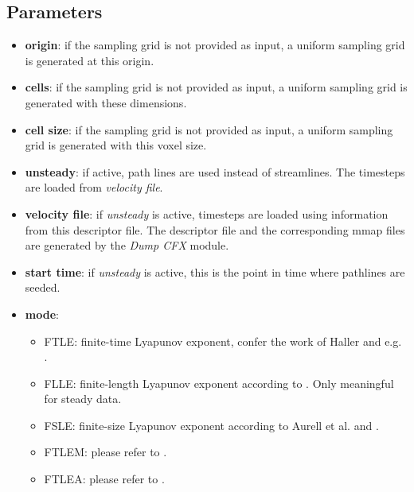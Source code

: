 \subsection{Parameters}
\begin{itemize}

\item
  \textbf{origin}: if the sampling grid is not provided as input, a uniform sampling grid is generated at this origin.

\item
  \textbf{cells}: if the sampling grid is not provided as input, a uniform sampling grid is generated with these dimensions.

\item
  \textbf{cell size}: if the sampling grid is not provided as input, a uniform sampling grid is generated with this voxel size.

\item
  \textbf{unsteady}: if active, path lines are used instead of streamlines. The timesteps are loaded from \emph{velocity file}.

\item
  \textbf{velocity file}: if \emph{unsteady} is active, timesteps are loaded using information from this descriptor file. The descriptor file and the corresponding mmap files are generated by the \emph{Dump CFX} module.

\item
  \textbf{start time}: if \emph{unsteady} is active, this is the point in time where pathlines are seeded.

\item
  \textbf{mode}:
  \begin{itemize}
  \item
    FTLE: finite-time Lyapunov exponent, confer the work of Haller \cite{Haller01} and e.g. \cite{Sadlo07ARidges}.
  \item
    FLLE: finite-length Lyapunov exponent according to \cite{Sadlo07ARidges}. Only meaningful for steady data.
  \item
    FSLE: finite-size Lyapunov exponent according to Aurell et al. \cite{Aurell97} and \cite{Sadlo07ARidges}.
  \item
    FTLEM: 
please refer
to \cite{Sadlo07ARidges}.
  \item
    FTLEA:
please refer
to \cite{Sadlo07ARidges}.
  \end{itemize}


\end{itemize}

